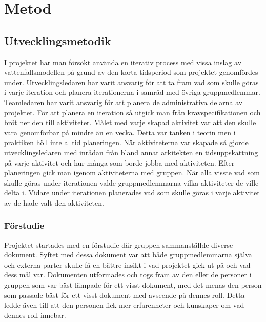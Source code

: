 \chapter{Metod}
\label{cha:method}

\section{Utvecklingsmetodik}

I projektet har man försökt använda en iterativ process med vissa inslag av vattenfallsmodellen på grund av den korta tidsperiod som projektet genomfördes under. Utvecklingsledaren har varit ansvarig för att ta fram vad som skulle göras i varje iteration och planera iterationerna i samråd med övriga gruppmedlemmar. Teamledaren har varit ansvarig för att planera de administrativa delarna av projektet. För att planera en iteration så utgick man från kravspecifikationen och bröt ner den till aktiviteter. Målet med varje skapad aktivitet var att den skulle vara genomförbar på mindre än en vecka. Detta var tanken i teorin men i praktiken höll inte alltid planeringen. När aktiviteterna var skapade så gjorde utvecklingsledaren med inrådan från bland annat arkitekten en tidsuppskattning på varje aktivitet och hur många som borde jobba med aktiviteten. Efter planeringen gick man igenom aktiviteterna med gruppen. När alla visste vad som skulle göras under iterationen valde gruppmedlemmarna vilka aktiviteter de ville delta i. Vidare under iterationen planerades vad som skulle göras i varje aktivitet av de hade valt den aktiviteten.

\subsection{Förstudie}

Projektet startades med en förstudie där gruppen sammanställde diverse dokument. Syftet med dessa dokument var att både gruppmedlemmarna själva och externa parter skulle få en bättre insikt i vad projektet gick ut på och vad dess mål var. Dokumenten utformades och togs fram av den eller de personer i gruppen som var bäst lämpade för ett visst dokument, med det menas den person som passade bäst för ett visst dokument med avseende på dennes roll. Detta ledde även till att den personen fick mer erfarenheter och kunskaper om vad dennes roll innebar.

